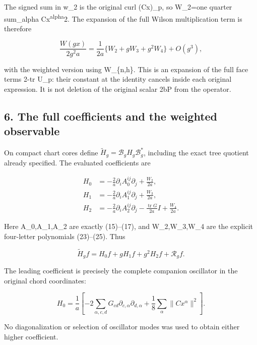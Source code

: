 \documentclass[
  11pt,
]{article}
\begin{document}
The signed sum in w\_2 is the original curl (Cx)\_p, so W\_2=one quarter
sum\_alpha
\textbar\textbar Cx\textsuperscript{alpha\textbar\textbar{}}2. The
expansion of the full Wilson multiplication term is therefore

\[
 \frac{W(gx)}{2g^2a}
 =\frac1{2a}\{W_2+gW_3+g^2W_4\}+O(g^3),                 \tag{26}
\]

with the weighted version using W\_\{n,h\}. This is an expansion of the
full face terms 2-tr U\_p: their constant at the identity cancels inside
each original expression. It is not deletion of the original scalar
2b\textbar P\textbar{} from the operator.

\subsection{6. The full coefficients and the weighted
observable}\label{weak-coupling-part-14-the-full-coefficients-and-the-weighted-observable}

On compact chart cores define \(\widetilde H_g=\mathcal B_gH_g
\mathcal B_g^*\), including the exact tree quotient already specified.
The evaluated coefficients are

\[
 \boxed{\begin{split}
 H_0&=-\frac2a\partial_i A_0^{ij}\partial_j+\frac{W_2}{2a},\\
 H_1&=-\frac2a\partial_i A_1^{ij}\partial_j+\frac{W_3}{2a},\\
 H_2&=-\frac2a\partial_i A_2^{ij}\partial_j
                     -\frac{\operatorname{tr}G}{2a}I
                     +\frac{W_4}{2a}.
 \end{split}}                                                \tag{27}
\]

Here A\_0,A\_1,A\_2 are exactly (15)--(17), and W\_2,W\_3,W\_4 are the
explicit four-letter polynomials (23)--(25). Thus

\[
 \widetilde H_g f=H_0f+gH_1f+g^2H_2f+\mathcal R_g f.
                                                               \tag{28}
\]

The leading coefficient is precisely the complete companion oscillator
in the original chord coordinates:

\[
 H_0=\frac1a\left[-2\sum_{\alpha,c,d}G_{cd}
          \partial_{c,\alpha}\partial_{d,\alpha}
                 +\frac18\sum_\alpha\|Cx^\alpha\|^2\right].
\]

No diagonalization or selection of oscillator modes was used to obtain
either higher coefficient.
\end{document}

